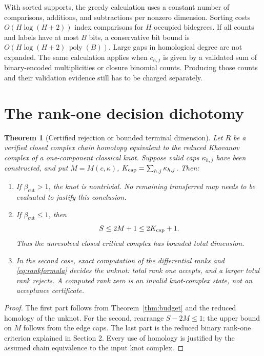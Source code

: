 \documentclass[11pt,letterpaper]{article}
\newtheorem{theorem}{Theorem}[section]
\theoremstyle{definition}\newtheorem{definition}[theorem]{Definition}
\theoremstyle{remark}\newtheorem{remark}[theorem]{Remark}
\newcommand{\poly}{\operatorname{poly}}
\newcommand{\cutlb}{\beta_{\mathrm{cut}}}
\begin{document}
With sorted supports, the greedy calculation uses a constant number of
comparisons, additions, and subtractions per nonzero dimension. Sorting
costs $O(H\log(H+2))$ index comparisons for $H$ occupied bidegrees.
If all counts and labels have at most $B$ bits, a conservative bit bound is
$O(H\log(H+2)\,\poly(B))$. Large gaps in homological degree are not expanded.
The same calculation applies when $c_{h,j}$ is given by a validated sum of
binary-encoded multiplicities or closure binomial counts. Producing those
counts and their validation evidence still has to be charged separately.

\section{The rank-one decision dichotomy}
\begin{theorem}[Certified rejection or bounded terminal dimension]
\label{thm:dichotomy}
Let $R$ be a verified closed complex chain homotopy equivalent to the reduced
Khovanov complex of a one-component classical knot. Suppose valid caps
$\kappa_{h,j}$ have been constructed, and put $M=M(c,\kappa)$,
$K_{\rm cap}=\sum_{h,j}\kappa_{h,j}$. Then:
\begin{enumerate}
\item If $\cutlb>1$, the knot is nontrivial. No remaining transferred map
needs to be evaluated to justify this conclusion.
\item If $\cutlb\leq1$, then
\begin{equation}
 S\leq 2M+1\leq2K_{\rm cap}+1.
\label{eq:dichotomy}
\end{equation}
Thus the unresolved closed critical complex has bounded total dimension.
\item In the second case, exact computation of the differential ranks and
\eqref{eq:rankformula} decides the unknot: total rank one accepts, and a
larger total rank rejects. A computed rank zero is an invalid knot-complex
state, not an acceptance certificate.
\end{enumerate}
\end{theorem}
\begin{proof}
The first part follows from Theorem~\ref{thm:budget} and the reduced homology
of the unknot. For the second, rearrange $S-2M\leq1$; the upper bound on $M$
follows from the edge caps. The last part is the reduced binary rank-one
criterion explained in Section 2. Every use of homology is justified by the
assumed chain equivalence to the input knot complex.
\end{proof}
\end{document}
